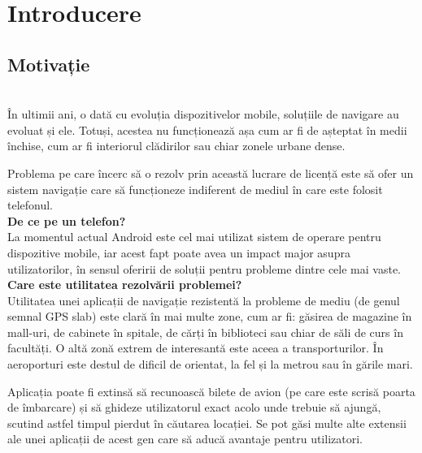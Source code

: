\documentclass[12pt, a4paper, oneside]{article}
\begin{document}
\newpage
\tableofcontents
{}

\pagestyle{fancy}

\newpage
\section*{Introducere}
\subsection{Motivație}
\\
În ultimii ani, o dată cu evoluția dispozitivelor mobile, soluțiile de navigare au evoluat și ele. Totuși, acestea nu funcționează așa cum ar fi de așteptat în medii închise, cum ar fi interiorul clădirilor sau chiar zonele urbane dense.

Problema pe care încerc să o rezolv prin această lucrare de licență este să ofer un sistem navigație care să funcționeze indiferent de mediul în care este folosit telefonul.\\

\textbf{De ce pe un telefon?}\\
La momentul actual Android este cel mai utilizat sistem de operare pentru dispozitive mobile, iar acest fapt poate avea un impact major asupra utilizatorilor, în sensul oferirii de soluții pentru probleme dintre cele mai vaste.\\

\textbf{Care este utilitatea rezolvării problemei?}\\
Utilitatea unei aplicații de navigație rezistentă la probleme de mediu (de genul semnal GPS slab) este clară în mai multe zone, cum ar fi: găsirea de magazine în mall-uri, de cabinete în spitale, de cărți în biblioteci sau chiar de săli de curs în facultăți. O altă zonă extrem de interesantă este aceea a transporturilor. În aeroporturi este destul de dificil de orientat, la fel și la metrou sau în gările mari. 

Aplicația poate fi extinsă să recunoască bilete de avion (pe care este scrisă poarta de îmbarcare) și să ghideze utilizatorul exact acolo unde trebuie să ajungă, scutind astfel timpul pierdut în căutarea locației. Se pot găsi multe alte extensii ale unei aplicații de acest gen care să aducă avantaje pentru utilizatori.
\end{document}
